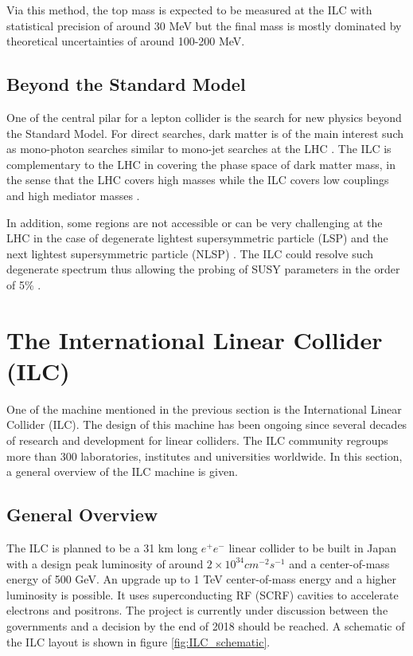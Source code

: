 Via this method, the top mass is expected to be measured at the ILC with statistical precision of around 30 MeV but the final mass is mostly dominated by theoretical uncertainties of around 100-200 MeV.

\subsection{Beyond the Standard Model}

One of the central pilar for a lepton collider is the search for new physics beyond the Standard Model. For direct searches, dark matter is of the main interest such as mono-photon searches similar to mono-jet searches at the LHC \cite{Gustavino:2017dub}. The ILC is complementary to the LHC in covering the phase space of dark matter mass, in the sense that the LHC covers high masses while the ILC covers low couplings and high mediator masses \cite{Habermehl:2017dxh}.

In addition, some regions are not accessible or can be very challenging at the LHC in the case of degenerate lightest supersymmetric particle (LSP) and the next lightest supersymmetric particle (NLSP) \cite{Baer:2011ec}. The ILC could resolve such degenerate spectrum thus allowing the probing of SUSY parameters in the order of 5\% \cite{Reuter:2016olv}.

\section{The International Linear Collider (ILC)}
\label{sec:ILC}

One of the machine mentioned in the previous section is the International Linear Collider (ILC). The design of this machine has been ongoing since several decades of research and development for linear colliders. The ILC community regroups more than 300 laboratories, institutes and universities worldwide. In this section, a general overview of the ILC machine is given.

\subsection{General Overview}

The ILC is planned to be a 31 km long $e^+e^-$ linear collider to be built in Japan with a design peak luminosity of around $2 \times 10^{34} cm^{-2}s^{-1}$ and a center-of-mass energy of 500 GeV. An upgrade up to 1 TeV center-of-mass energy and a higher luminosity is possible. It uses superconducting RF (SCRF) cavities to accelerate electrons and positrons. The project is currently under discussion between the governments and a decision by the end of 2018 should be reached. A schematic of the ILC layout is shown in figure \ref{fig:ILC_schematic}.

